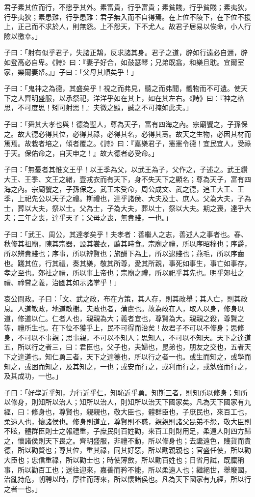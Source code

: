 \documentclass[12pt,a4paper]{ctexbook}
\begin{document}
君子素其位而行，不愿乎其外。素富貴，行乎富貴；素貧賤，行乎貧賤；素夷狄，行乎夷狄；素患難，行乎患難：君子無入而不自得焉。在上位不陵下，在下位不援上，正己而不求於人，則無怨。上不怨天，下不尤人。故君子居易以俟命，小人行險以徼幸。」\par
子曰：「射有似乎君子，失諸正鵠，反求諸其身。君子之道，辟如行遠必自邇，辟如登高必自卑。《詩》曰：『妻子好合，如鼓瑟琴；兄弟既翕，和樂且耽。宜爾室家，樂爾妻帑。』」子曰：「父母其順矣乎！」\par
子曰：「鬼神之為德，其盛矣乎！視之而弗見，聽之而弗聞，體物而不可遺。使天下之人齊明盛服，以承祭祀，洋洋乎如在其上，如在其左右。《詩》曰：『神之格思，不可度思！矧可射思！』夫微之顯，誠之不可掩如此夫。」\par
子曰：「舜其大孝也與！德為聖人，尊為天子，富有四海之內。宗廟饗之，子孫保之。故大德必得其位，必得其祿，必得其名，必得其壽。故天之生物，必因其材而篤焉。故栽者培之，傾者覆之。《詩》曰：『嘉樂君子，憲憲令德！宜民宜人，受祿于天。保佑命之，自天申之！』故大德者必受命。」\par
子曰：「無憂者其惟文王乎！以王季為父，以武王為子，父作之，子述之。武王纘大王、王季、文王之緒，壹戎衣而有天下，身不失天下之顯名；尊為天子，富有四海之內。宗廟饗之，子孫保之。武王末受命，周公成文、武之德，追王大王、王季，上祀先公以天子之禮。斯禮也，達乎諸侯、大夫及士、庶人。父為大夫，子為士，葬以大夫，祭以士。父為士，子為大夫，葬以士，祭以大夫。期之喪，達乎大夫；三年之喪，達乎天子；父母之喪，無貴賤，一也。」\par
子曰：「武王、周公，其達孝矣乎！夫孝者：善繼人之志，善述人之事者也。春、秋修其祖廟，陳其宗器，設其裳衣，薦其時食。宗廟之禮，所以序昭穆也；序爵，所以辨貴賤也；序事，所以辨賢也；旅酬下為上，所以逮賤也；燕毛，所以序齒也。踐其位，行其禮，奏其樂，敬其所尊，愛其所親，事死如事生，事亡如事存，孝之至也。郊社之禮，所以事上帝也；宗廟之禮，所以祀乎其先也。明乎郊社之禮、禘嘗之義，治國其如示諸掌乎！」\par
哀公問政。子曰：「文、武之政，布在方策，其人存，則其政舉；其人亡，則其政息。人道敏政，地道敏樹。夫政也者，蒲盧也。故為政在人，取人以身，修身以道，修道以仁。仁者人也，親親為大；義者宜也，尊賢為大。親親之殺，尊賢之等，禮所生也。在下位不獲乎上，民不可得而治矣！故君子不可以不修身；思修身，不可以不事親；思事親，不可以不知人；思知人，不可以不知天。天下之達道五，所以行之者三，曰：君臣也，父子也，夫婦也，昆弟也，朋友之交也，五者天下之達道也。知仁勇三者，天下之達德也，所以行之者一也。或生而知之，或學而知之，或困而知之，及其知之，一也；或安而行之，或利而行之，或勉強而行之，及其成功，一也。」\par
子曰：「好學近乎知，力行近乎仁，知恥近乎勇。知斯三者，則知所以修身；知所以修身，則知所以治人；知所以治人，則知所以治天下國家矣。凡為天下國家有九經，曰：修身也，尊賢也，親親也，敬大臣也，體群臣也，子庶民也，來百工也，柔遠人也，懷諸侯也。修身則道立，尊賢則不惑，親親則諸父昆弟不怨，敬大臣則不眩，體群臣則士之報禮重，子庶民則百姓勸，來百工則財用足，柔遠人則四方歸之，懷諸侯則天下畏之。齊明盛服，非禮不動，所以修身也；去讒遠色，賤貨而貴德，所以勸賢也；尊其位，重其祿，同其好惡，所以勸親親也；官盛任使，所以勸大臣也；忠信重祿，所以勸士也；時使薄斂，所以勸百姓也；日省月試，既廩稱事，所以勸百工也；送往迎來，嘉善而矜不能，所以柔遠人也；繼絕世，舉廢國，治亂持危，朝聘以時，厚往而薄來，所以懷諸侯也。凡為天下國家有九經，所以行之者一也。」\par
\end{document}
